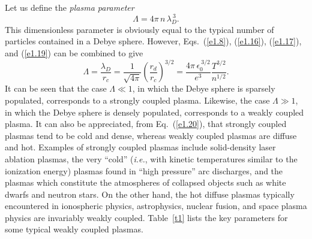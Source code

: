 Let us define the {\em plasma parameter}\/
\begin{equation}\label{e1.19}
{\Lambda} = 4\pi\, n\, \lambda_D^{~3}.
\end{equation}
This dimensionless parameter is obviously equal to the typical number of particles
contained in a Debye sphere. However, Eqs.~(\ref{e1.8}), (\ref{e1.16}), (\ref{e1.17}), and (\ref{e1.19})
 can be combined to
give
\begin{equation}\label{e1.20}
{\Lambda} = \frac{\lambda_D}{r_c}=\frac{1}{\sqrt{4\pi}} \left(\frac{r_d}{r_c}\right)^{3/2} =
\frac{4\pi \,\epsilon_0^{~3/2}}{e^3} \frac{T^{3/2}}{n^{1/2}}.
\end{equation}
It can be seen that the case ${\Lambda}\ll 1$, in which the Debye
sphere is sparsely populated, corresponds to a strongly coupled plasma.
Likewise, the case ${\Lambda}\gg 1$, in which the Debye sphere is
densely populated, corresponds to a weakly coupled plasma. It can also
be appreciated, from Eq.~(\ref{e1.20}), that strongly coupled plasmas
tend to be cold and dense, whereas weakly coupled plasmas are diffuse and
hot. Examples of strongly coupled plasmas include solid-density laser ablation
plasmas, the very ``cold''  ({\em i.e.}, with kinetic temperatures
similar to the ionization energy) plasmas found in ``high pressure'' arc discharges, and the plasmas which constitute the 
atmospheres of collapsed objects such as white dwarfs and neutron stars.
On the other hand, the hot diffuse plasmas typically encountered in ionospheric
physics, astrophysics, nuclear fusion, and space plasma physics are invariably
weakly coupled. Table~\ref{t1} lists the key parameters for some typical
weakly coupled plasmas.

